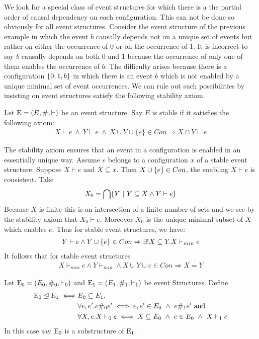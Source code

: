 We look for a special class of event structures for which there is a
the partial order of causal dependency on each configuration.
This can not be done so obviously for all event structures.
Consider the event structure of the previous example in which
the event $b$ causally depends not on a unique set of events
but rather on either the occurrence of 0 or on the occurrence of 1.
It is incorrect to say $b$ causally depends on both 0 and 1 because
the occurrence of only one of them enables the occurrence of $b$.
The difficulty arises because there is a configuration $\{0,1,b\}$
in which there is an event $b$ which is not enabled by a unique minimal
set of event occurrences.
We can rule out such possibilities by insisting on event structures
satisfy the following stability axiom.
\begin{definition}
    Let $\mathrm{E} = (E,\#,\vdash)$ be an event structure. Say $E$ is stable if it satisfies the following axiom:
    \begin{align*}
        X \vdash e \ \wedge \ Y \vdash e \ \wedge \ X \cup Y \cup \{e\} \in Con \Rightarrow X \cap Y \vdash e
    \end{align*}
\end{definition}
The stability axiom ensures that an event in a configuration is
enabled in an essentially unique way.
Assume $e$ belongs to a configuration $x$ of a stable event structure.
Suppose $X \vdash e$ and $X \subseteq x$.
Then $X \cup \{e\} \in Con$, the enabling $X\vdash e$ is consistent.
Take
\begin{align*}
    X_0 = \bigcap \{Y ~|~ Y \subseteq X \wedge Y \vdash e\}
\end{align*}
Because $X$ is finite this is an intersection of a finite number of
sets and we see by the stability axiom that $X_0 \vdash e$.
Moreover $X_0$ is the unique minimal subset of $X$ which enables $e$.
Thus for stable event structures, we have:
\begin{align*}
    Y \vdash e \wedge Y \cup \{e\} \in Con \Rightarrow
    \exists ! X \subseteq Y.X \vdash_{min} e
\end{align*}
It follows that for stable event structures
\begin{align*}
    X \vdash_{min} e \wedge Y \vdash_{min} \wedge
    X \cup Y \cup e \in Con \Rightarrow X = Y
\end{align*}
\begin{definition}
    Let $\mathrm{E_0} = (E_0,\#_0,\vdash_0)$ and $\mathrm{E_1} = (E_1,\#_1,\vdash_1)$
    be event Structures. Define
    \begin{align*}
        \mathrm{E_0} \trianglelefteq \mathrm{E_1} \iff
         & E_0 \subseteq E_1,                            \\
         & \forall e,e'. e\#_0e'  \iff e,e' \in E_0
        \ \wedge \ e\#_1 e' \text{ and }                 \\
         & \forall X,e.X\vdash_0 e  \iff X \subseteq E_0
        \ \wedge \ e \in E_0\ \wedge \ X \vdash_1 e
    \end{align*}
    In this case say $\mathrm{E_0}$ is a substructure of $\mathrm{E_1}$.
\end{definition}

